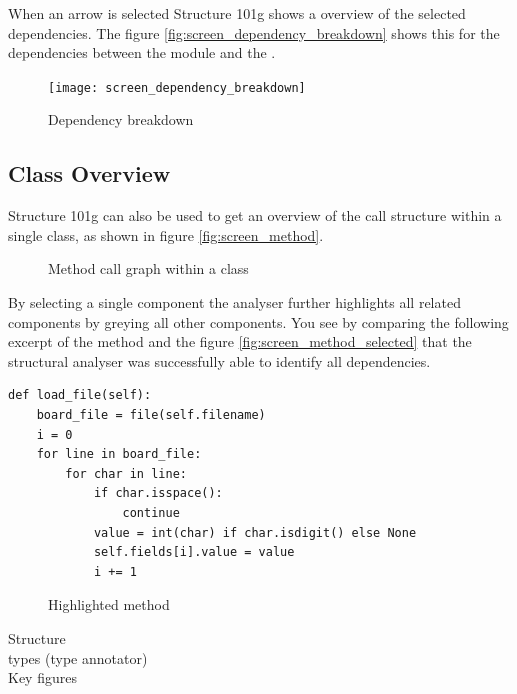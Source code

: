 \documentclass[12pt,halfparskip,DIV11,BCOR10mm]{scrreprt}
\begin{document}
When an arrow is selected Structure 101g shows a overview of the selected dependencies. The figure \vref{fig:screen_dependency_breakdown} shows this for the dependencies between the module  and the . 

\begin{figure}[H]
    \centering
    \texttt{[image: screen\_dependency\_breakdown]}
    \caption{Dependency breakdown}
    \label{fig:screen_dependency_breakdown}
\end{figure}

\subsection{Class Overview}

Structure 101g can also be used to get an overview of the call structure within a single class, as shown in figure \vref{fig:screen_method}. 

\begin{figure}[H]
    \centering
    \caption{Method call graph within a class}
    \label{fig:screen_method}
\end{figure}

By selecting a single component the analyser further highlights all related components by greying all other components. You see by comparing the  following excerpt of the method  and the figure \vref{fig:screen_method_selected} that the structural analyser was successfully able to identify all dependencies.

\begin{lstlisting}
def load_file(self):
    board_file = file(self.filename)
    i = 0        
    for line in board_file:
        for char in line:
            if char.isspace():
                continue
            value = int(char) if char.isdigit() else None
            self.fields[i].value = value
            i += 1
\end{lstlisting}

\begin{figure}[H]
    \centering
    \caption{Highlighted method}
    \label{fig:screen_method_selected}
\end{figure}


Structure \\
types (type annotator)\\
Key figures
\end{document}
